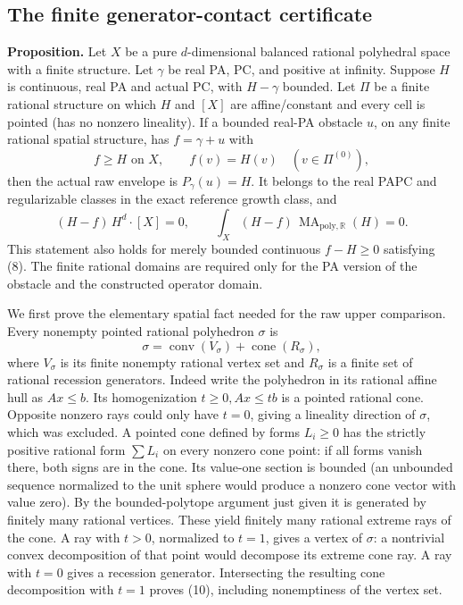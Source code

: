\documentclass[
  10pt,
]{article}
\begin{document}
\subsection{The finite generator-contact
certificate}\label{the-finite-generator-contact-certificate}

\textbf{Proposition.} Let \(X\) be a pure \(d\)-dimensional balanced
rational polyhedral space with a finite structure. Let \(\gamma\) be
real PA, PC, and positive at infinity. Suppose \(H\) is continuous, real
PA and actual PC, with \(H-\gamma\) bounded. Let \(\Pi\) be a finite
rational structure on which \(H\) and \([X]\) are affine/constant and
every cell is pointed (has no nonzero lineality). If a bounded real-PA
obstacle \(u\), on any finite rational spatial structure, has
\(f=\gamma+u\) with \[
 f\geq H\text{ on }X,\qquad f(v)=H(v)\quad(v\in\Pi^{(0)}),       \tag{8}
\] then the actual raw envelope is \(P_\gamma(u)=H\). It belongs to the
real PAPC and regularizable classes in the exact reference growth class,
and \[
 (H-f)\,H^d\cdot[X]=0,\qquad\int_X(H-f)\,\operatorname{MA}_{\mathrm{poly},\mathbb{R}}(H)=0. \tag{9}
\] This statement also holds for merely bounded continuous \(f-H\geq0\)
satisfying (8). The finite rational domains are required only for the PA
version of the obstacle and the constructed operator domain.

We first prove the elementary spatial fact needed for the raw upper
comparison. Every nonempty pointed rational polyhedron \(\sigma\) is \[
 \sigma=\operatorname{conv}(V_\sigma)+\operatorname{cone}(R_\sigma), \tag{10}
\] where \(V_\sigma\) is its finite nonempty rational vertex set and
\(R_\sigma\) is a finite set of rational recession generators. Indeed
write the polyhedron in its rational affine hull as \(Ax\leq b\). Its
homogenization \(t\geq0, Ax\leq tb\) is a pointed rational cone.
Opposite nonzero rays could only have \(t=0\), giving a lineality
direction of \(\sigma\), which was excluded. A pointed cone defined by
forms \(L_i\geq0\) has the strictly positive rational form \(\sum L_i\)
on every nonzero cone point: if all forms vanish there, both signs are
in the cone. Its value-one section is bounded (an unbounded sequence
normalized to the unit sphere would produce a nonzero cone vector with
value zero). By the bounded-polytope argument just given it is generated
by finitely many rational vertices. These yield finitely many rational
extreme rays of the cone. A ray with \(t>0\), normalized to \(t=1\),
gives a vertex of \(\sigma\): a nontrivial convex decomposition of that
point would decompose its extreme cone ray. A ray with \(t=0\) gives a
recession generator. Intersecting the resulting cone decomposition with
\(t=1\) proves (10), including nonemptiness of the vertex set.
\end{document}
